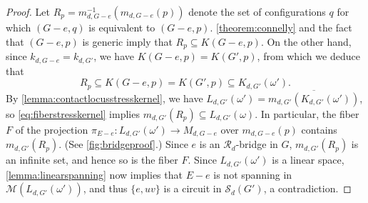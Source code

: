 \documentclass[11pt,a4paper,dvipsnames]{scrartcl}
\theoremstyle{definition}
\newcommand{\stressnullity}[1]{k_{d, #1}}
\newcommand{\algmat}[1]{\mathcal{M}(#1)}
\newcommand{\stressmatroid}[2]{\mathcal{S}_{#1}(#2)}
\newcommand{\stresskernel}[2]{K_{{#1},{#2}}}
\newcommand{\sharedstresskernel}[1]{K}
\newcommand{\contactlocus}[2]{L_{#1,#2}}
\begin{document}
\begin{proof}
    Let $R_p = m_{d,G-e}^{-1}(m_{d,G-e}(p))$ denote the set of configurations $q$ for which $(G-e,q)$ is equivalent to $(G-e,p)$. \cref{theorem:connelly} and the fact that $(G-e,p)$ is generic imply that $R_p \subseteq \sharedstresskernel{d}(G-e,p)$. On the other hand, since $\stressnullity{G-e} = \stressnullity{G'}$, we have $\sharedstresskernel{d}(G-e,p) = \sharedstresskernel{d}(G',p)$, from which we deduce that
    \begin{equation}\label{eq:fiberstresskernel}
        R_p \subseteq \sharedstresskernel{d}(G-e,p) = \sharedstresskernel{d}(G',p) \subseteq \stresskernel{d}{G'}(\omega').    
    \end{equation}
     By \cref{lemma:contactlocusstresskernel}, we have $\contactlocus{d}{G'}(\omega') = \overline{m_{d,G'}(\stresskernel{d}{G'}(\omega'))}$, so \cref{eq:fiberstresskernel} implies $m_{d,G'}(R_p) \subseteq \contactlocus{d}{G'}(\omega)$. In particular, the fiber $F$ of the projection $\pi_{E-e} : \contactlocus{d}{G'}(\omega') \rightarrow M_{d,G-e}$ over $m_{d,G-e}(p)$ contains $m_{d,G'}(R_p)$. (See \cref{fig:bridgeproof}.) Since $e$ is an $\mathcal{R}_d$-bridge in $G$, $m_{d,G'}(R_p)$ is an infinite set, and hence so is the fiber $F$. Since $\contactlocus{d}{G'}(\omega')$ is a linear space, \cref{lemma:linearspanning} now implies that $E-e$ is not spanning in $\algmat{\contactlocus{d}{G'}(\omega')}$, and thus $\{e,uv\}$ is a circuit in $\stressmatroid{d}{G'}$, a contradiction.     
\end{proof}

\usetikzlibrary{decorations.pathmorphing}
\usetikzlibrary{calc}
\end{document}
